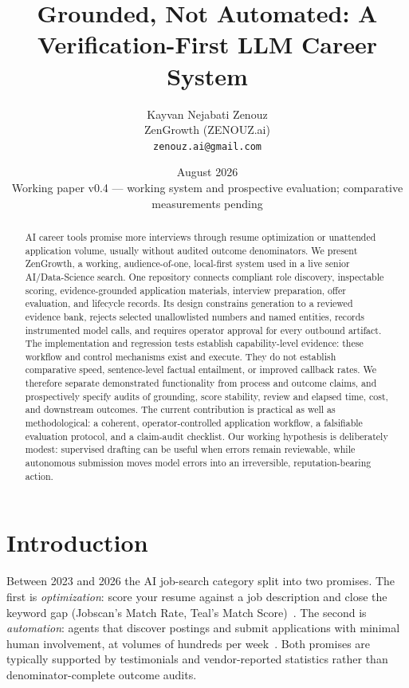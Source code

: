 \documentclass[11pt]{article}
\title{\textbf{Grounded, Not Automated: A Verification-First LLM Career System}}
\author{%
  Kayvan Nejabati Zenouz\\
  ZenGrowth (ZENOUZ.ai)\\
  \texttt{zenouz.ai@gmail.com}%
}
\date{August 2026\\[0.5em]\normalsize Working paper v0.4 --- working system and
prospective evaluation; comparative measurements pending}
\begin{document}
\maketitle

\begin{abstract}
AI career tools promise more interviews through resume optimization or
unattended application volume, usually without audited outcome denominators.
We present ZenGrowth, a working, audience-of-one, local-first system used in a
live senior AI/Data-Science search. One repository connects compliant role
discovery, inspectable scoring, evidence-grounded application materials,
interview preparation, offer evaluation, and lifecycle records. Its design
constrains generation to a reviewed evidence bank, rejects selected
unallowlisted numbers and named entities, records instrumented model calls,
and requires operator approval for every outbound artifact. The implementation
and regression tests establish capability-level evidence: these workflow and
control mechanisms exist and execute. They do not establish comparative speed,
sentence-level factual entailment, or improved callback rates. We therefore
separate demonstrated functionality from process and outcome claims, and
prospectively specify audits of grounding, score stability, review and elapsed
time, cost, and downstream outcomes. The current contribution is practical as
well as methodological: a coherent, operator-controlled application workflow,
a falsifiable evaluation protocol, and a claim-audit checklist. Our working
hypothesis is deliberately modest: supervised drafting can be useful when
errors remain reviewable, while autonomous submission moves model errors into
an irreversible, reputation-bearing action.
\end{abstract}

\section{Introduction}

Between 2023 and 2026 the AI job-search category split into two promises.
The first is \emph{optimization}: score your resume against a job
description and close the keyword gap (Jobscan's Match Rate, Teal's Match
Score)~\citep{jobscan2026, tealhq2026}. The second is \emph{automation}:
agents that discover postings and submit applications with minimal human
involvement, at volumes of hundreds per week~\citep{jobcopilot2026,
aihawk2026}. Both promises are typically supported by testimonials and
vendor-reported statistics rather than denominator-complete outcome audits.
\end{document}
